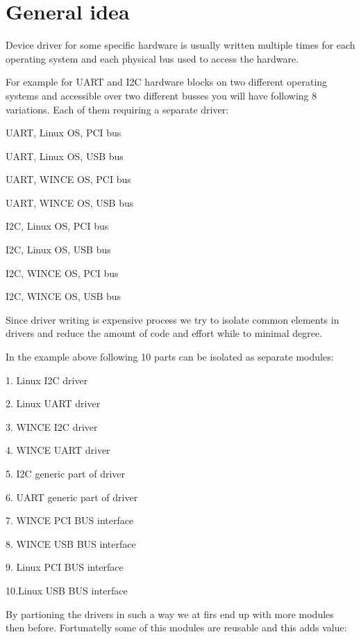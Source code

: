 \hypertarget{p3_p3s1}{}\section{\-General idea}\label{p3_p3s1}
\-Device driver for some specific hardware is usually written multiple times for each operating system and each physical bus used to access the hardware.

\-For example for \-U\-A\-R\-T and \-I2\-C hardware blocks on two different operating systems and accessible over two different busses you will have following 8 variations. \-Each of them requiring a separate driver\-: \begin{DoxyItemize}
\item \-U\-A\-R\-T, \-Linux \-O\-S, \-P\-C\-I bus \item \-U\-A\-R\-T, \-Linux \-O\-S, \-U\-S\-B bus \item \-U\-A\-R\-T, \-W\-I\-N\-C\-E \-O\-S, \-P\-C\-I bus \item \-U\-A\-R\-T, \-W\-I\-N\-C\-E \-O\-S, \-U\-S\-B bus \item \-I2\-C, \-Linux \-O\-S, \-P\-C\-I bus \item \-I2\-C, \-Linux \-O\-S, \-U\-S\-B bus \item \-I2\-C, \-W\-I\-N\-C\-E \-O\-S, \-P\-C\-I bus \item \-I2\-C, \-W\-I\-N\-C\-E \-O\-S, \-U\-S\-B bus\end{DoxyItemize}
\-Since driver writing is expensive process we try to isolate common elements in drivers and reduce the amount of code and effort while to minimal degree.

\-In the example above following 10 parts can be isolated as separate modules\-: \begin{DoxyItemize}
\item 1. \-Linux \-I2\-C driver \item 2. \-Linux \-U\-A\-R\-T driver \item 3. \-W\-I\-N\-C\-E \-I2\-C driver \item 4. \-W\-I\-N\-C\-E \-U\-A\-R\-T driver \item 5. \-I2\-C generic part of driver \item 6. \-U\-A\-R\-T generic part of driver \item 7. \-W\-I\-N\-C\-E \-P\-C\-I \-B\-U\-S interface \item 8. \-W\-I\-N\-C\-E \-U\-S\-B \-B\-U\-S interface \item 9. \-Linux \-P\-C\-I \-B\-U\-S interface \item 10.\-Linux \-U\-S\-B \-B\-U\-S interface\end{DoxyItemize}
\-By partioning the drivers in such a way we at firs end up with more modules then before. \-Fortunatelly some of this modules are reusable and this adds value\-:

